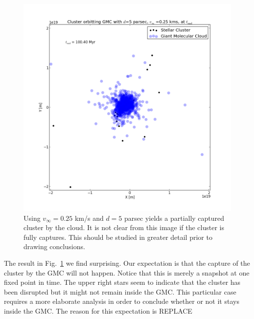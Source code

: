 \documentclass{aa}
\begin{document}
\begin{figure}[h!]
    \centering
    \includegraphics[width=\hsize]{img/v_25_d_5.png}
    \caption{Using $v_\infty = 0.25$ km/s and $d = 5$ parsec yields a partially captured cluster by the cloud. It is not clear from this image if the cluster is fully captures. This should be studied in greater detail prior to drawing conclusions.}\label{fig:v_25_d_5}
\end{figure}

The result in Fig.~\ref{fig:v_25_d_5} we find surprising. Our expectation is that the capture of the cluster by the GMC will not happen. Notice that this is merely a snapshot at one fixed point in time. The upper right stars seem to indicate that the cluster has been disrupted but it might not remain inside the GMC. This particular case requires a more elaborate analysis in order to conclude whether or not it stays inside the GMC. The reason for this expectation is REPLACE
\end{document}
